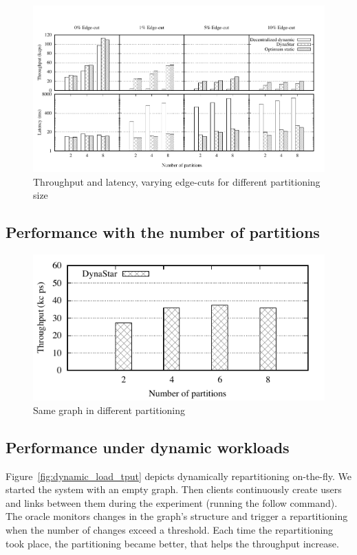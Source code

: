 \begin{figure}[ht!]
	\includegraphics{figures/experiments/throughput-latency-avg-all}
	\caption{Throughput and latency, varying edge-cuts for different partitioning size}
	\label{fig:varying_edge_cut}
\end{figure}


\subsection{Performance with the number of partitions}
\label{sec:evaluation:results}

\begin{figure}[ht]
	\includegraphics{figures/experiments/throughput-avg-vary-partition}
	\caption{Same graph in different partitioning}
	\label{fig:4p1p_varying_partition_size}
\end{figure}


\subsection{Performance under dynamic workloads}

Figure~\ref{fig:dynamic_load_tput} depicts dynamically repartitioning
on-the-fly.  We started the system with an empty graph. Then clients
continuously create users and links between them during the experiment
(running the follow command).  The oracle monitors changes in the
graph's structure and trigger a repartitioning when the number of
changes exceed a threshold.  Each time the repartitioning took place,
the partitioning became better, that helps the throughput increase.

